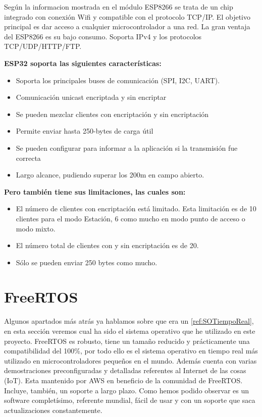 Según la informacion mostrada en \cite{moduloEsp8266} el módulo ESP8266 se trata de un chip integrado con conexión Wifi y compatible con el protocolo TCP/IP. El objetivo principal es dar acceso a cualquier microcontrolador a una red. La gran ventaja del ESP8266 es su bajo consumo. Soporta IPv4 y los protocolos TCP/UDP/HTTP/FTP.


\textbf{ESP32 soporta las siguientes características:}
\begin{itemize}
\item Soporta los principales buses de comunicación (SPI, I2C, UART).
\item Comunicación unicast encriptada y sin encriptar
\item Se pueden mezclar clientes con encriptación y sin encriptación
\item Permite enviar hasta 250-bytes de carga útil
\item Se pueden configurar  para informar a la aplicación si la transmisión fue correcta
\item Largo alcance, pudiendo superar los 200m en campo abierto.
\end{itemize}

\textbf{Pero también tiene sus limitaciones, las cuales son:}
\begin{itemize}
\item El número de clientes con encriptación está limitado. Esta limitación es de 10 clientes para el modo Estación, 6 como mucho en modo punto de acceso o modo mixto.
\item El número total de clientes con y sin encriptación es de 20.
\item Sólo se pueden enviar 250 bytes como mucho.
\end{itemize}

\section{FreeRTOS}\label{sec:RTOS}
Algunos apartados más atrás ya hablamos sobre que era un  \ref{ref:SOTiempoReal}, en esta sección veremos cual ha sido el sistema operativo que he utilizado en este proyecto.
FreeRTOS es robusto, tiene un tamaño reducido y prácticamente una compatibilidad del 100\%, por todo ello es el sistema operativo en tiempo real más utilizado en microcontroladores pequeños en el mundo.
Además cuenta con varias demostraciones preconfiguradas y detalladas referentes al Internet de las cosas (IoT). Esta mantenido por AWS en beneficio de la comunidad de FreeRTOS. Incluye, también, un soporte a largo plazo.
Como hemos podido observar es un software completísimo, referente mundial, fácil de usar y con un soporte que saca actualizaciones constantemente.


